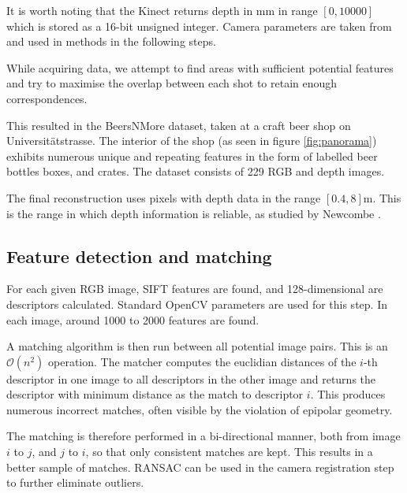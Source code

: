 \documentclass[10pt,twocolumn,letterpaper]{article}
\begin{document}
It is worth noting that the Kinect returns depth in mm in range $[0, 10000]$
which is stored as a 16-bit unsigned integer. Camera parameters are taken from
\cite{smisek20133d} and used in methods in the following steps.

While acquiring data, we attempt to find areas with sufficient potential
features and try to maximise the overlap between each shot to retain enough
correspondences.

This resulted in the BeersNMore dataset, taken at a craft beer shop on
Universit\"atstrasse. The interior of the shop (as seen in figure \ref{fig:panorama}) exhibits
numerous unique and repeating features in the form of labelled beer bottles
boxes, and crates. The dataset consists of 229 RGB and depth images.

The final reconstruction uses pixels with depth data in the range
$\left[0.4,8\right]$m. This is the range in which depth information
is reliable, as studied by Newcombe \etal \cite{newcombe2011kinectfusion}.




\subsection{Feature detection and matching}\label{sec:extractfeature}

For each given RGB image, SIFT features are found, and 128-dimensional are
descriptors calculated. Standard OpenCV parameters are used for this step.
In each image, around 1000 to 2000 features are found.

A matching algorithm is then run between all potential image pairs. This is
an $\mathcal{O}(n^2)$ operation. The matcher computes the euclidian distances of the $i$-th descriptor in one image to all descriptors in the other image and returns the descriptor with minimum distance as the match to descriptor $i$. This produces numerous
incorrect matches, often visible by the violation of epipolar geometry.

The matching is therefore performed in a bi-directional manner, both from image
$i$ to $j$, and $j$ to $i$, so that only consistent matches are kept. This results in a better sample of matches. RANSAC
can be used in the camera registration step to further eliminate outliers.



\end{document}

